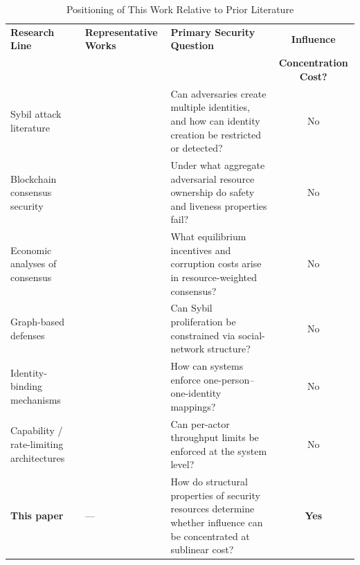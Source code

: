 \documentclass[10pt,journal,compsoc]{IEEEtran}
\theoremstyle{remark}
\begin{document}
	\begin{table}[t]
		\caption{Positioning of This Work Relative to Prior Literature}
		\label{tab:positioning}
		\centering
		\renewcommand{\arraystretch}{1.4}
		\begin{tabularx}{\textwidth}{@{}p{3.8cm}Xp{4.5cm}c@{}}
			\toprule
			\textbf{Research Line} & \textbf{Representative Works} & \textbf{Primary Security Question} & \textbf{Influence} \\
			&                               &                                    & \textbf{Concentration Cost?} \\
			\midrule
			Sybil attack literature
			& \cite{douceur2002sybil,yu2006sybilguard,yu2008sybillimit,danezis2009sybilinfer}
			& Can adversaries create multiple identities, and how can identity creation be restricted or detected?
			& No \\[4pt]
			Blockchain consensus security
			& \cite{lamport1982byzantine,castro1999pbft,garay2015backbone,ren2019nakamoto,kiayias2017ouroboros,gilad2017algorand}
			& Under what aggregate adversarial resource ownership do safety and liveness properties fail?
			& No \\[4pt]
			Economic analyses of consensus
			& \cite{budish2018economic,budish2024economic,kroll2013economics}
			& What equilibrium incentives and corruption costs arise in resource-weighted consensus?
			& No \\[4pt]
			Graph-based defenses
			& \cite{yu2006sybilguard,yu2008sybillimit,danezis2009sybilinfer}
			& Can Sybil proliferation be constrained via social-network structure?
			& No \\[4pt]
			Identity-binding mechanisms
			& \cite{borge2017pop,ford2020pseudonym}
			& How can systems enforce one-person--one-identity mappings?
			& No \\[4pt]
			Capability / rate-limiting architectures
			& \cite{costan2016intel,levy1984capability,jacobson1988congestion}
			& Can per-actor throughput limits be enforced at the system level?
			& No \\
			\midrule
			\textbf{This paper}
			& ---
			& How do structural properties of security resources determine whether influence can be concentrated at sublinear cost?
			& \textbf{Yes} \\
			\bottomrule
		\end{tabularx}
	\end{table}
	
\end{document}
